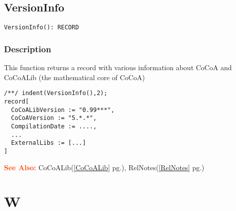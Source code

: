 \documentclass[a4paper]{mybook}
\newenvironment{command}{}{} %
\newcommand\SeeAlso{\par\textcolor{OrangeRed}{\textbf{\large See Also: }}}
\begin{document}
\section{VersionInfo}
\label{VersionInfo}
\begin{command} %


\begin{Verbatim}[label=syntax, rulecolor=\color{MidnightBlue},
frame=single]
VersionInfo(): RECORD
\end{Verbatim}


\subsection*{Description}

This function returns a record with various information about CoCoA
and CoCoALib (the mathematical core of CoCoA)
\begin{Verbatim}[label=example, rulecolor=\color{PineGreen}, frame=single]
/**/ indent(VersionInfo(),2);
record[
  CoCoALibVersion := "0.99***",
  CoCoAVersion := "5.*.*",
  CompilationDate := ....,
  ...
  ExternalLibs := [...]
]
\end{Verbatim}


\SeeAlso %
  CoCoALib(\ref{CoCoALib} pg.\pageref{CoCoALib}), 
    RelNotes(\ref{RelNotes} pg.\pageref{RelNotes})
\end{command} %

\chapter{W}  %
\label{W}
\end{document}
